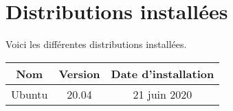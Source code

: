 \chapter{Distributions installées}

Voici les différentes distributions installées.


\begin{table}[!h]
  \begin{tabular}{*{3}{c}}
    \hline
    Nom & Version & Date d'installation\\
    \hline
    Ubuntu & 20.04 & 21 juin 2020 \\
    \hline
  \end{tabular}
\end{table}
